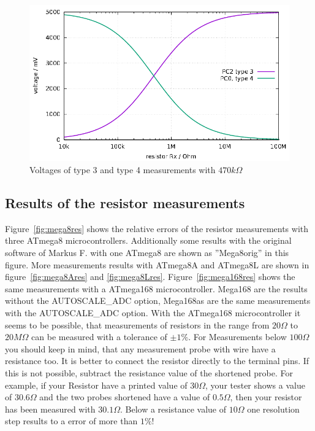 \begin{figure}[H]
\centering
\includegraphics[width=16cm]{../GNU/RHv.pdf}
\caption{Voltages of type 3 and type 4 measurements with \(470k\Omega\) }
\label{fig:RHv}
\end{figure}

\subsection{Results of the resistor measurements}
Figure~\ref{fig:mega8res} shows the relative errors of the resistor measurements with three
ATmega8 microcontrollers. Additionally some results with the original software of Markus F.
with one ATmega8 are shown as ''Mega8orig'' in this figure.
More measurements results with ATmega8A and ATmega8L are shown in  figure~\ref{fig:mega8Ares} 
and \ref{fig:mega8Lres}.
Figure~\ref{fig:mega168res} shows the same measurements with a ATmega168 microcontroller.
Mega168 are the results without the AUTOSCALE\_ADC option, Mega168as are the same
measurements with the AUTOSCALE\_ADC option.
With the ATmega168 microcontroller it seems to be possible, that measurements of resistors
in the range from \(20\Omega\) to \(20M\Omega\) can be measured with a tolerance of \(\pm1\%\).
For Measurements below \(100\Omega\) you should keep in mind, that any measurement probe with
wire have a resistance too. It is better to connect the resistor directly to the terminal pins.
If this is not possible, subtract the resistance value of the shortened probe.
For example, if your Resistor have a printed value of \(30\Omega\), your tester shows a value of \(30.6\Omega\)
and the two probes shortened have a value of \(0.5\Omega\), then your resistor has been measured
with \(30.1\Omega\).
Below a resistance value of \(10\Omega\) one resolution step results to a error of more than \(1\%\)!

